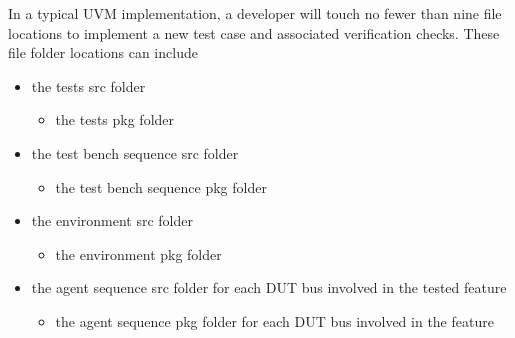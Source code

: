 \documentclass[twocolumn,letterpaper]{IEEEAerospaceCLS}  %
\begin{document}
In a typical UVM implementation, a developer will touch no fewer than nine file locations to implement a new test case and associated verification checks. These file folder locations can include
\begin{itemize}
    \item the tests src folder
    \begin{itemize}
        \item the tests pkg folder
    \end{itemize}
    \item the test bench sequence src folder
    \begin{itemize}
        \item the test bench sequence pkg folder
    \end{itemize}
    \item the environment src folder
    \begin{itemize}
        \item the environment pkg folder
    \end{itemize}
    \item the agent sequence src folder for each DUT bus involved in the tested feature
    \begin{itemize}
        \item the agent sequence pkg folder for each DUT bus involved in the feature
    \end{itemize}
\end{itemize}
\end{document}
